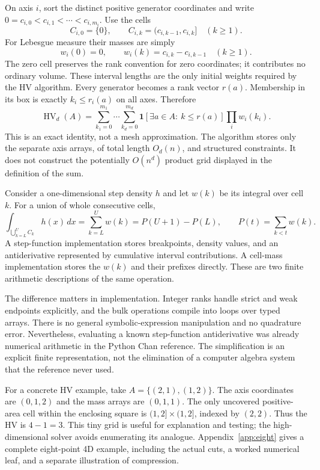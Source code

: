 \documentclass[12pt,a4paper]{article}
\theoremstyle{definition}
\newcommand{\HV}{\operatorname{HV}}
\newcommand{\ind}{\mathbf 1}
\begin{document}
On axis $i$, sort the distinct positive generator coordinates and write
$0=c_{i,0}<c_{i,1}<\cdots<c_{i,m_i}$. Use the cells
\[
 C_{i,0}=\{0\},\qquad C_{i,k}=(c_{i,k-1},c_{i,k}]\quad(k\ge1).
\]
For Lebesgue measure their masses are simply
\[
 w_i(0)=0,\qquad w_i(k)=c_{i,k}-c_{i,k-1}\quad(k\ge1).
\]
The zero cell preserves the rank convention for zero coordinates; it
contributes no ordinary volume. These interval lengths are the only
initial weights required by the HV algorithm.
Every generator becomes a rank vector $r(a)$. Membership in its box is
exactly $k_i\le r_i(a)$ on all axes. Therefore
\begin{equation}
 \HV_d(A)=\sum_{k_1=0}^{m_1}\cdots\sum_{k_d=0}^{m_d}
       \ind[\exists a\in A:\ k\le r(a)]\prod_iw_i(k_i).
 \label{eq:finite-sum}
\end{equation}
This is an exact identity, not a mesh approximation. The algorithm stores
only the separate axis arrays, of total length $O_d(n)$, and structured
constraints. It does not construct the potentially $O(n^d)$ product grid
displayed in the definition of the sum.

Consider a one-dimensional step density $h$ and let $w(k)$ be its
integral over cell $k$. For a union of whole consecutive cells,
\[
          \int_{\bigcup_{k=L}^U C_k}h(x)\,dx
             =\sum_{k=L}^U w(k)=P(U+1)-P(L),
 \qquad P(t)=\sum_{k<t}w(k).
\]
A step-function implementation stores breakpoints, density values, and
an antiderivative represented by cumulative interval contributions.
A cell-mass implementation stores the $w(k)$ and their prefixes directly.
These are two finite arithmetic descriptions of the same operation.

The difference matters in implementation. Integer ranks handle strict
and weak endpoints explicitly, and the bulk operations compile into
loops over typed arrays.
There is no general symbolic-expression manipulation and no quadrature
error. Nevertheless, evaluating a known step-function antiderivative was
already numerical arithmetic in the Python Chan reference. The
simplification is an explicit finite representation, not the elimination
of a computer algebra system that the reference never used.

For a concrete HV example, take $A=\{(2,1),(1,2)\}$.
The axis coordinates are $(0,1,2)$ and the mass arrays are $(0,1,1)$.
The only uncovered positive-area cell within the enclosing square is
$(1,2]\times(1,2]$, indexed by $(2,2)$. Thus the HV is $4-1=3$.
This tiny grid is useful for explanation and testing; the high-dimensional
solver avoids enumerating its analogue.
Appendix~\ref{app:eight} gives a complete eight-point 4D example,
including the actual cuts, a worked numerical leaf, and a separate
illustration of compression.
\end{document}
